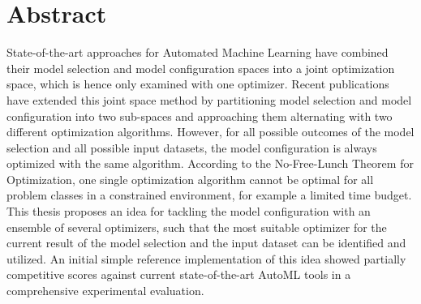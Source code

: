 %
\chapter*{Abstract}
\label{sec:abstract}
\vspace*{-15mm}

State-of-the-art approaches for Automated Machine Learning have combined their model selection and model configuration spaces into a joint optimization space, which is hence only examined with one optimizer.
Recent publications have extended this joint space method by partitioning model selection and model configuration into two sub-spaces and approaching them alternating with two different optimization algorithms.
However, for all possible outcomes of the model selection and all possible input datasets, the model configuration is always optimized with the same algorithm.
According to the No-Free-Lunch Theorem for Optimization, one single optimization algorithm cannot be optimal for all problem classes in a constrained environment, for example a limited time budget.
This thesis proposes an idea for tackling the model configuration with an ensemble of several optimizers, such that the most suitable optimizer for the current result of the model selection and the input dataset can be identified and utilized.
An initial simple reference implementation of this idea showed partially competitive scores against current state-of-the-art AutoML tools in a comprehensive experimental evaluation.
\vspace*{10mm}

